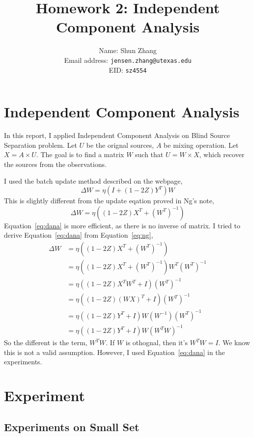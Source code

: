 \documentclass[10pt]{article}
\title{Homework 2: Independent Component Analysis}
\author{Name: Shun Zhang\\
Email address: \texttt{jensen.zhang@utexas.edu}\\
EID: \texttt{sz4554}}
\date{}
\begin{document}
\maketitle

\section{Independent Component Analysis}

In this report, I applied Independent Component Analysis on Blind Source
Separation problem. Let $U$ be the orignal sources, $A$ be mixing
operation. Let $X = A \times U$. The goal is to find a matrix $W$ such that
$U = W \times X$, which recover the sources from the observations. 

I used the batch update method described on the webpage,
\begin{equation}
	\label{eq:dana}
	\Delta W = \eta (I + (1 - 2Z) Y^T)W
\end{equation}
This is slightly different from the update eqation proved in Ng's note,
\begin{equation}
	\Delta W = \eta ((1 - 2Z) X^T + (W^T)^{-1})
	\label{eq:ng}
\end{equation}
Equation~\ref{eq:dana} is more efficient, as there is no inverse of matrix.
I tried to derive Equation~\ref{eq:dana} from Equation~\ref{eq:ng},
\begin{align}
	\Delta W &= \eta ((1 - 2Z) X^T + (W^T)^{-1}) \\
	&= \eta ((1 - 2Z) X^T + (W^T)^{-1})W^T (W^T)^{-1} \\
	&= \eta ((1 - 2Z) X^T W^T + I)(W^T)^{-1} \\
	&= \eta ((1 - 2Z) (W X)^T + I)(W^T)^{-1} \\
	&= \eta ((1 - 2Z) Y^T + I)W (W^{-1})(W^T)^{-1} \\
	&= \eta ((1 - 2Z) Y^T + I)W (W^TW)^{-1}
	\label{eq:equiv}
\end{align}
So the different is the term, $W^TW$. If $W$ is othognal, then it's $W^TW =
I$. We know this is not a valid assumption. However, I used
Equation~\ref{eq:dana} in the experiments.

\section{Experiment}

\subsection{Experiments on Small Set}
\end{document}
